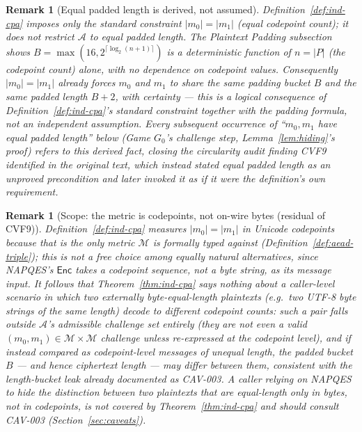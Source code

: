 \documentclass[11pt,a4paper]{article}
\newtheorem{remark}[theorem]{Remark}
\begin{document}
\begin{remark}[Equal padded length is derived, not assumed]
\label{rem:equal-padded-derived}
Definition~\ref{def:ind-cpa} imposes only the standard constraint
$|m_0|=|m_1|$ (equal codepoint count); it does not restrict $\mathcal{A}$
to equal \emph{padded} length. The Plaintext Padding subsection shows
$B=\max(16,2^{\lceil\log_2(n+1)\rceil})$ is a deterministic function of
$n=|P|$ (the codepoint count) alone, with no dependence on codepoint
\emph{values}. Consequently $|m_0|=|m_1|$ already forces $m_0$ and $m_1$
to share the same padding bucket $B$ and the same padded length $B+2$,
with certainty --- this is a logical consequence of
Definition~\ref{def:ind-cpa}'s standard constraint together with the
padding formula, not an independent assumption. Every subsequent
occurrence of ``$m_0,m_1$ have equal padded length'' below (Game $G_0$'s
challenge step, Lemma~\ref{lem:hiding}'s proof) refers to this derived
fact, closing the circularity audit finding CVF9 identified in the
original text, which instead stated equal padded length as an unproved
precondition and later invoked it as if it were the definition's own
requirement.
\end{remark}

\begin{remark}[Scope: the metric is codepoints, not on-wire bytes (residual of CVF9)]
\label{rem:cvf9-byte-metric}
Definition~\ref{def:ind-cpa} measures $|m_0|=|m_1|$ in Unicode codepoints
because that is the only metric $\mathcal{M}$ is formally typed against
(Definition~\ref{def:aead-triple}); this is not a free choice among
equally natural alternatives, since NAPQES's $\mathsf{Enc}$ takes a
codepoint sequence, not a byte string, as its message input. It follows
that Theorem~\ref{thm:ind-cpa} says nothing about a caller-level scenario
in which two externally byte-equal-length plaintexts (e.g.\ two UTF-8
byte strings of the same length) decode to \emph{different} codepoint
counts: such a pair falls outside $\mathcal{A}$'s admissible challenge set
entirely (they are not even a valid $(m_0,m_1)\in\mathcal{M}\times\mathcal{M}$
challenge unless re-expressed at the codepoint level), and if instead
compared as codepoint-level messages of unequal length, the padded bucket
$B$ --- and hence ciphertext length --- may differ between them,
consistent with the length-bucket leak already documented as CAV-003. A
caller relying on NAPQES to hide the distinction between two plaintexts
that are equal-length only in bytes, not in codepoints, is not covered by
Theorem~\ref{thm:ind-cpa} and should consult CAV-003 (Section~\ref{sec:caveats}).
\end{remark}
\end{document}
